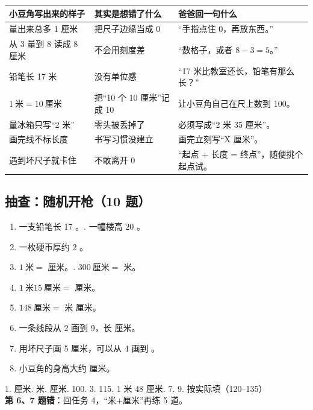 \begin{center}
\small
\begin{tabularx}{\linewidth}{@{}p{3.8cm}p{4.0cm}X@{}}
\toprule
\textbf{小豆角写出来的样子} & \textbf{其实是想错了什么} & \textbf{爸爸回一句什么} \\
\midrule
量出来总多 1 厘米 & 把尺子边缘当成 0 & “手指点住 0，再放东西。” \\
\addlinespace[2pt]
从 3 量到 8 读成 8 厘米 & 不会用刻度差 & “数格子，或者 $8-3=5$。” \\
\addlinespace[2pt]
铅笔长 17 米 & 没有单位感 & “17 米比教室还长，铅笔有那么长？” \\
\addlinespace[2pt]
$1\ \text{米}=10\ \text{厘米}$ & 把“10 个 10 厘米”记成 10 & 让小豆角自己在尺上数到 100。 \\
\addlinespace[2pt]
量冰箱只写“2 米” & 零头被丢掉了 & 必须写成“2 米 35 厘米”。 \\
\addlinespace[2pt]
画完线不标长度 & 书写习惯没建立 & 画完立刻写“X 厘米”。 \\
\addlinespace[2pt]
遇到坏尺子就卡住 & 不敢离开 0 & “起点 + 长度 = 终点”，随便挑个起点试。 \\
\bottomrule
\end{tabularx}
\end{center}

\subsection{抽查：随机开枪（10 题）}

\begin{enumerate}[label=\arabic*.,itemsep=4pt]
  \item 一支铅笔长 17 \blank[1.6cm]。. 一幢楼高 20 \blank[1.6cm]。
  \item 一枚硬币厚约 2 \blank[1.6cm]。
  \item $1\ \text{米}=$ \blank[1.6cm] 厘米。. $300\ \text{厘米}=$ \blank[1.6cm] 米。
  \item $1\ \text{米}15\ \text{厘米}=$ \blank[1.6cm] 厘米。
  \item $148\ \text{厘米}=$ \blank[1cm] 米 \blank[1cm] 厘米。
  \item 一条线段从 2 画到 9，长 \blank[1.6cm] 厘米。
  \item 用坏尺子画 5 厘米，可以从 4 画到 \blank[1.6cm]。
  \item 小豆角的身高大约 \blank[1.6cm] 厘米。
\end{enumerate}

\begin{ansbox}
1. 厘米. 米. 厘米. 100. 3. 115. 1 米 48 厘米. 7. 9. 按实际填（120--135）\\
\textbf{第 6、7 题错}：回任务 4，“米+厘米”再练 5 道。
\end{ansbox}

